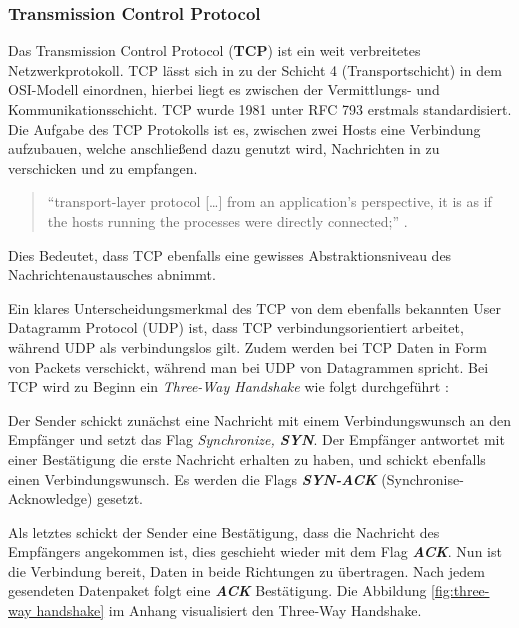 \documentclass[paper=a4,fontsize=12pt,ngerman]{scrartcl}
\begin{document}
\subsubsection{Transmission Control Protocol}

Das Transmission Control Protocol (\textbf{TCP}) ist ein weit verbreitetes Netzwerkprotokoll. 
TCP lässt sich in zu der Schicht 4 (Transportschicht) in dem OSI-Modell einordnen, hierbei liegt es zwischen der Vermittlungs- und Kommunikationsschicht.
\newline TCP wurde 1981 unter RFC 793 erstmals standardisiert. \cite{rfc793}  \newline
Die Aufgabe des TCP Protokolls ist es, zwischen zwei Hosts eine Verbindung aufzubauen, welche anschließend dazu genutzt wird,  
Nachrichten in zu verschicken und zu empfangen.

\begin{quote}
``transport-layer protocol [\dots] from an application’s perspective, it is as if 
the hosts running the processes were directly connected;'' \cite[241]{kr22}.      
\end{quote}


Dies Bedeutet, dass TCP ebenfalls eine gewisses Abstraktionsniveau
des Nachrichtenaustausches abnimmt. 


Ein klares Unterscheidungsmerkmal des TCP von dem ebenfalls bekannten User Datagramm Protocol (UDP) ist, dass TCP verbindungsorientiert arbeitet, 
während UDP als verbindungslos gilt. Zudem werden bei TCP Daten in Form von Packets verschickt, während man bei UDP von Datagrammen spricht. \newline
Bei TCP wird zu Beginn ein \textit{Three-Way Handshake}
wie folgt durchgeführt : 

Der Sender schickt zunächst eine Nachricht mit einem Verbindungswunsch an den Empfänger und setzt das Flag 
\textit{Synchronize, \textbf{SYN}}.
\newline
Der Empfänger antwortet mit einer Bestätigung die erste Nachricht erhalten zu haben, und schickt ebenfalls einen 
Verbindungswunsch. Es werden die Flags \textit{\textbf{SYN-ACK}} (Synchronise-Acknowledge) gesetzt.


Als letztes schickt der Sender eine Bestätigung, dass die Nachricht des Empfängers angekommen ist, dies geschieht wieder
mit dem Flag \textit{\textbf{ACK}}. Nun ist die Verbindung bereit, Daten in beide Richtungen zu übertragen.
Nach jedem gesendeten Datenpaket folgt eine \textit{\textbf{ACK}} Bestätigung.
\newline Die Abbildung \ref{fig:three-way handshake} im Anhang visualisiert den Three-Way Handshake.
\end{document}
